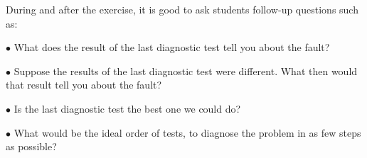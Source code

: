During and after the exercise, it is good to ask students follow-up questions such as:

\medskip
\item{$\bullet$} What does the result of the last diagnostic test tell you about the fault?
\item{$\bullet$} Suppose the results of the last diagnostic test were different.  What then would that result tell you about the fault?
\item{$\bullet$} Is the last diagnostic test the best one we could do?
\item{$\bullet$} What would be the ideal order of tests, to diagnose the problem in as few steps as possible?
\medskip




